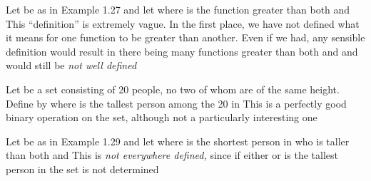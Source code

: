 \documentclass[11pt,oneside]{article}
\begin{document}
\begin{BookBody}
 Let  be as in Example 1.27 and let  where  is the function greater than both  and  This “definition” is extremely vague. In the first place, we have not defined what it means for one function to be greater than another. Even if we had, any sensible definition would result in there being many functions greater than both  and  and \BookInline{\ast } would still be\textit{ not well defined}\BookEnd{\blacktriangle}

 Let  be a set consisting of 20 people, no two of whom are of the same height. Define \BookInline{\ast } by  where  is the tallest person among the 20 in  This is a perfectly good binary operation on the set, although not a particularly interesting one\BookEnd{\blacktriangle}

 Let  be as in Example 1.29 and let  where  is the shortest person in  who is taller than both  and  This \BookInline{\ast } is\textit{ not everywhere defined,} since if either  or  is the tallest person in the set is not determined\BookEnd{\blacktriangle}

\end{BookBody}

\BookNarrativefalse
\end{document}
